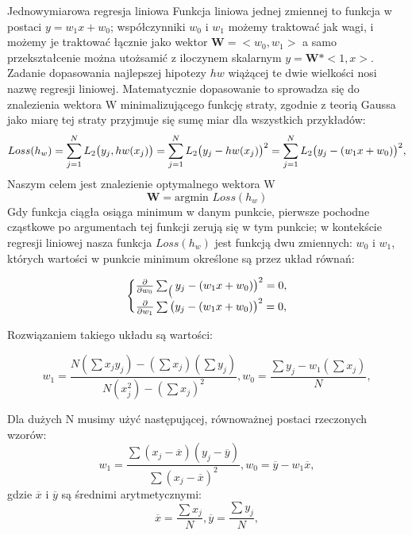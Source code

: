 \begin{easyappendix}{ Jednowymiarowa regresja liniowa}
\cite{russell2023} Funkcja liniowa jednej zmiennej to funkcja w postaci \(y=w_1x +w_0\); współczynniki \(w_0\) i \(w_1\) możemy traktować jak wagi, i możemy je traktować łącznie jako wektor \(\textbf{W}=<w_0,w_1>\) a samo przekształcenie można utożsamić z iloczynem skalarnym \(y=\textbf{W}*<1,x> \). Zadanie dopasowania najlepszej hipotezy \(hw\) wiążącej te dwie wielkości nosi nazwę regresji liniowej. Matematycznie dopasowanie to sprowadza się do znalezienia wektora W minimalizującego funkcję straty, zgodnie z teorią Gaussa jako miarę tej straty przyjmuje się sumę miar dla wszystkich przykładów:
\begin{equation*}
       Loss(h_w) = \sum_{j=1}^{N} L_2 \big{(}y_j, hw(x_j)\big{)} = \sum_{j=1}^{N} L_2 \big{(}y_j-hw(x_j)\big{)}^2 =
       \sum_{j=1}^{N} L_2 \big{(}y_j-(w_1x + w_0)\big{)}^2,
\end{equation*}
Naszym celem jest znalezienie optymalnego wektora W 
\begin{equation*}
       \textbf{W} = \text{argmin } Loss(h_w)
\end{equation*}
Gdy funkcja ciągła osiąga minimum w danym punkcie, pierwsze pochodne cząstkowe po argumentach tej funkcji zerują się w tym punkcie; w kontekście regresji liniowej nasza funkcja \(Loss(h_w)\) jest funkcją dwu zmiennych: \(w_0\) i \(w_1\), których wartości w punkcie minimum określone są przez układ równań:
 

    \begin{equation*}
        \Biggl\{
                \begin{matrix}
                    \frac{\partial}{\partial{w_0}} \sum_ \big{(}y_j -(w_1x + w_0)\big{)}^2 = 0,\\
                     
                    \frac{\partial}{\partial{w_1}} \sum \big{(}y_j -(w_1x + w_0)\big{)}^2 = 0,
                \end{matrix} 
    \end{equation*} 

Rozwiązaniem takiego układu są wartości:

\begin{equation}
w_1=\frac{ N(\sum x_jy_j)-(\sum x_j)(\sum y_j) }{ N(x_j^2)-(\sum x_j)^2 }, 
w_0=\frac{\sum y_j - w_1( \sum x_j)}{N},
\end{equation}

Dla dużych N\cite{russell2023} musimy użyć następującej, równoważnej postaci rzeczonych wzorów:
\begin{equation}
w_1=\frac{ \sum (x_j-\overline{x})( y_j - \overline{y}  )  }{ \sum ( x_j - \overline{x} )^2 }, 
w_0=\overline y - w_1\overline x,
\label{eq:linearregresion}
\end{equation}
gdzie \(\overline{x}\) i \(\overline{y} \) są średnimi arytmetycznymi: 
\begin{equation}
\overline{x}=\frac{\sum x_j}{N}, \overline{y}=\frac{\sum y_j}{N},
\end{equation}
\end{easyappendix}

 
